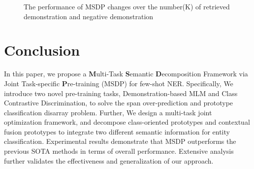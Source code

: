 \documentclass[sigconf,natbib=true,anonymous=False]{acmart}
\begin{document}
\begin{table}[!tbp]
\small
\centering
   \caption{The parameter analysis of the temperature hyperparameter . }
  \label{tab:temperature}\vspace{-0.2cm}
\end{table}

\begin{figure}[t]
\centering
{}
\caption{The performance of MSDP changes over the number(K) of retrieved demonstration and negative demonstration }
\label{fig:7}
\end{figure}















\section{Conclusion}

In this paper, we propose a \textbf{M}ulti-Task \textbf{S}emantic \textbf{D}ecomposition Framework via Joint Task-specific \textbf{P}re-training (MSDP) for few-shot NER. Specifically, We introduce two novel pre-training tasks, Demonstration-based MLM and Class Contrastive Discrimination, to solve the span over-prediction and prototype classification disarray problem. Further, We design a multi-task joint optimization framework, and decompose class-oriented prototypes and contextual fusion prototypes to integrate two different semantic information for entity classification. Experimental results demonstrate that MSDP outperforms the previous SOTA methods in terms of overall performance. Extensive analysis further validates the effectiveness and generalization of our approach.


\balance

\end{document}
